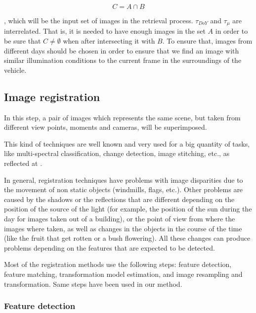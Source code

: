 \begin{equation}\label{eq:cp01_eligible_images}
C = A \cap B
\end{equation}

, which will be the input set of images in the retrieval process. $\tau_{DoY}$ and $\tau_{\mu}$ are interrelated. That is, it is needed to have enough images in the set $A$ in order to be sure that $C \neq \emptyset$ when after intersecting it with $B$. To ensure that, images from different days should be chosen in order to ensure that we find an image with similar illumination conditions to the current frame in the surroundings of the vehicle.

\subsection{Image registration}\label{ch:chapter01_01_02}

In this step, a pair of images which represents the same scene, but taken from different view points, moments and cameras, will be superimposed.

This kind of techniques are well known and very used for a big quantity of tasks, like multi-spectral classification, change detection, image stitching, etc., as reflected at \cite{kooper2011stitching, singh1996digital, coppin1996digital, radke2005image, zitova2003image}.

In general, registration techniques have problems with image disparities due to the movement of non static objects (windmills, flags, etc.). Other problems are caused by the shadows or the reflections that are different depending on the position of the source of the light (for example, the position of the sun during the day for images taken out of a building), or the point of view from where the images where taken, as well as changes in the objects in the course of the time (like the fruit that get rotten or a bush flowering). All these changes can produce problems depending on the features that are expected to be detected.

Most of the registration methods use the following steps: feature detection, feature matching, transformation model estimation, and image resampling and transformation. Same steps have been used in our method.

\subsubsection{Feature detection}\label{ch:chapter01_01_02_01}


